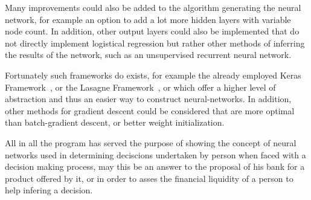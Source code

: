 \documentclass[12pt]{article}
\begin{document}
Many improvements could also be added to the algorithm generating the neural network, for example an option to add a lot more hidden layers with variable node count. In addition, other output layers could also be implemented that do not directly implement logistical regression but rather other methods of inferring the results of the network, such as an unsupervised recurrent neural network. 

Fortunately such frameworks do exists, for example  the already employed Keras Framework~\cite{keras}, or the Lasagne Framework~\cite{lasagne}, or which offer a higher level of abstraction and thus an easier way to construct neural-networks. In addition, other methods for gradient descent could be considered that are more optimal than batch-gradient descent, or better weight initialization.

All in all the program has served the purpose of showing the concept of neural networks used in determining deciscions undertaken by person when faced with a decision making process, may this be an answer to the proposal of his bank for a product offered by it, or in order to asses the financial liquidity of a person to help infering a decision.

\printbibliography{}
\end{document}
